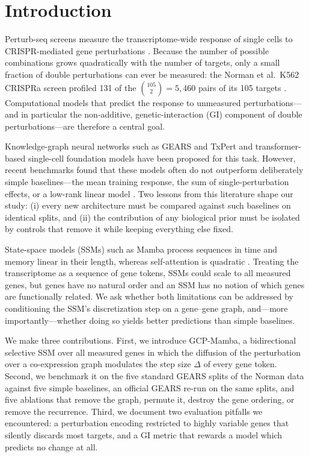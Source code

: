 \section{Introduction}

Perturb-seq screens measure the transcriptome-wide response of single cells to
CRISPR-mediated gene perturbations \citep{dixit2016,norman2019,replogle2022}.
Because the number of possible combinations grows quadratically with the number
of targets, only a small fraction of double perturbations can ever be measured:
the Norman et al.\ K562 CRISPRa screen profiled 131 of the
$\binom{105}{2}=5{,}460$ pairs of its 105 targets \citep{norman2019}.
Computational models that predict the response to unmeasured perturbations---and
in particular the non-additive, genetic-interaction (GI) component of double
perturbations---are therefore a central goal.

Knowledge-graph neural networks such as GEARS \citep{roohani2024} and TxPert
\citep{wenkel2026} and transformer-based single-cell foundation models
\citep{cui2024scgpt,theodoris2023} have been proposed for this task. However,
recent benchmarks found that these models often do not outperform deliberately
simple baselines---the mean training response, the sum of single-perturbation
effects, or a low-rank linear model
\citep{ahlmann2025,csendes2025}. Two lessons from this literature shape our
study: (i) every new architecture must be compared against such baselines on
identical splits, and (ii) the contribution of any biological prior must be
isolated by controls that remove it while keeping everything else fixed.

State-space models (SSMs) such as Mamba \citep{gu2023} process sequences in time
and memory linear in their length, whereas self-attention is quadratic
\citep{vaswani2017}. Treating the transcriptome as a sequence of gene tokens,
SSMs could scale to all measured genes, but genes have no natural order and an
SSM has no notion of which genes are functionally related. We ask whether both
limitations can be addressed by conditioning the SSM's discretization step on a
gene--gene graph, and---more importantly---whether doing so yields better
predictions than simple baselines.

We make three contributions. First, we introduce GCP-Mamba, a bidirectional
selective SSM over all measured genes in which the diffusion of the perturbation
over a co-expression graph modulates the step size $\Delta$ of every gene token.
Second, we benchmark it on the five standard GEARS splits of the Norman data
against five simple baselines, an official GEARS re-run on the same splits, and
five ablations that remove the graph, permute it, destroy the gene ordering, or
remove the recurrence. Third, we document two evaluation pitfalls we
encountered: a perturbation encoding restricted to highly variable genes that
silently discards most targets, and a GI metric that rewards a model which
predicts no change at all.

